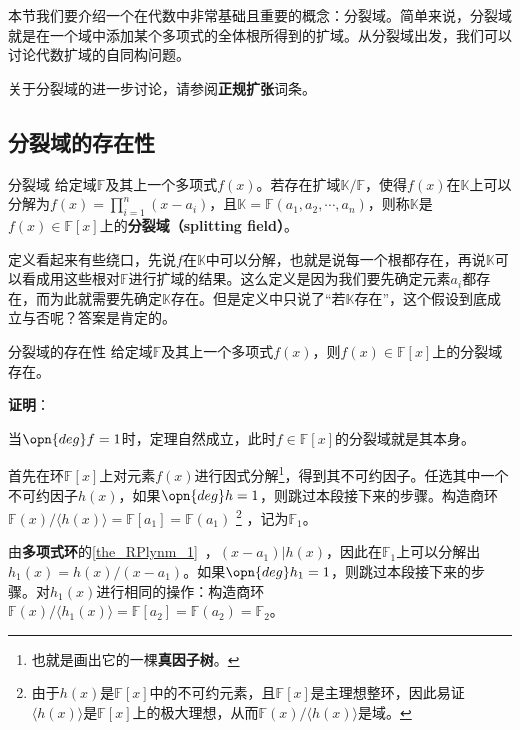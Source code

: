 


本节我们要介绍一个在代数中非常基础且重要的概念：分裂域。简单来说，分裂域就是在一个域中添加某个多项式的全体根所得到的扩域。从分裂域出发，我们可以讨论代数扩域的自同构问题。

关于分裂域的进一步讨论，请参阅\textbf{正规扩张}词条。


\subsection{分裂域的存在性}


\begin{definition}{分裂域}
给定域$\mathbb{F}$及其上一个多项式$f(x)$。若存在扩域$\mathbb{K}/\mathbb{F}$，使得$f(x)$在$\mathbb{K}$上可以分解为$f(x)=\prod_{i=1}^n (x-a_i)$，且$\mathbb{K}=\mathbb{F}(a_1, a_2, \cdots, a_n)$，则称$\mathbb{K}$是$f(x)\in \mathbb{F}[x]$上的\textbf{分裂域（splitting field）}。
\end{definition}

定义看起来有些绕口，先说$f$在$\mathbb{K}$中可以分解，也就是说每一个根都存在，再说$\mathbb{K}$可以看成用这些根对$\mathbb{F}$进行扩域的结果。这么定义是因为我们要先确定元素$a_i$都存在，而为此就需要先确定$\mathbb{K}$存在。但是定义中只说了“若$\mathbb{K}$存在”，这个假设到底成立与否呢？答案是肯定的。

\begin{theorem}{分裂域的存在性}
给定域$\mathbb{F}$及其上一个多项式$f(x)$，则$f(x)\in \mathbb{F}[x]$上的分裂域存在。
\end{theorem}

\textbf{证明}：

当$\opn{deg}f=1$时，定理自然成立，此时$f\in\mathbb{F}[x]$的分裂域就是其本身。

首先在环$\mathbb{F}[x]$上对元素$f(x)$进行因式分解\footnote{也就是画出它的一棵\textbf{真因子树}。}，得到其不可约因子。任选其中一个不可约因子$h(x)$，如果$\opn{deg} h = 1$，则跳过本段接下来的步骤。构造商环$\mathbb{F}(x)/\langle h(x) \rangle =\mathbb{F}[a_1]=\mathbb{F}(a_1)$
\footnote{由于$h(x)$是$\mathbb{F}[x]$中的不可约元素，且$\mathbb{F}[x]$是主理想整环，因此易证$\langle h(x) \rangle$是$\mathbb{F}[x]$上的极大理想，从而$\mathbb{F}(x)/\langle h(x) \rangle$是域。}
，记为$\mathbb{F}_1$。

由\textbf{多项式环}的\autoref{the_RPlynm_1}~，$(x-a_1)|h(x)$，因此在$\mathbb{F}_1$上可以分解出$h_1(x)=h(x)/(x-a_1)$。如果$\opn{deg}h_1 = 1$，则跳过本段接下来的步骤。对$h_1(x)$进行相同的操作：构造商环$\mathbb{F}(x)/\langle h_1(x) \rangle =\mathbb{F}[a_2] = \mathbb{F}(a_2)=\mathbb{F}_2$。

